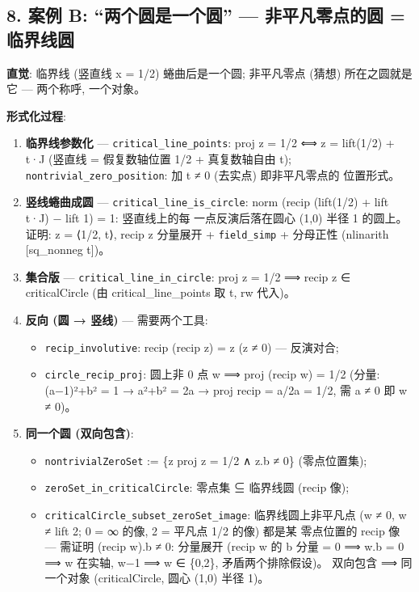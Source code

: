 \documentclass[
]{article}
\providecommand{\tightlist}{%
  \setlength{\itemsep}{0pt}\setlength{\parskip}{0pt}}
\begin{document}
\subsection{8. 案例 B: ``两个圆是一个圆'' --- 非平凡零点的圆 =
临界线圆}\label{ux6848ux4f8b-b-ux4e24ux4e2aux5706ux662fux4e00ux4e2aux5706-ux975eux5e73ux51e1ux96f6ux70b9ux7684ux5706-ux4e34ux754cux7ebfux5706}

\textbf{直觉}: 临界线 (竖直线 x = 1/2) 蜷曲后是一个圆; 非平凡零点 (猜想)
所在之圆就是它 --- 两个称呼, 一个对象。

\textbf{形式化过程}:

\begin{enumerate}
\def\labelenumi{\arabic{enumi}.}
\tightlist
\item
  \textbf{临界线参数化} --- \texttt{critical\_line\_points}: proj z =
  1/2 ⟺ z = lift(1/2) + t·J (竖直线 = 假复数轴位置 1/2 + 真复数轴自由
  t); \texttt{nontrivial\_zero\_position}: 加 t ≠ 0 (去实点)
  即非平凡零点的 位置形式。
\item
  \textbf{竖线蜷曲成圆} --- \texttt{critical\_line\_is\_circle}: norm
  (recip (lift(1/2) + lift t·J) − lift 1) = 1: 竖直线上的每
  一点反演后落在圆心 (1,0) 半径 1 的圆上。证明: z = ⟨1/2, t⟩, recip z
  分量展开 + \texttt{field\_simp} + 分母正性 (nlinarith {[}sq\_nonneg
  t{]})。
\item
  \textbf{集合版} --- \texttt{critical\_line\_in\_circle}: proj z = 1/2
  ⟹ recip z ∈ criticalCircle (由 critical\_line\_points 取 t, rw 代入)。
\item
  \textbf{反向 (圆 → 竖线)} --- 需要两个工具:

  \begin{itemize}
  \tightlist
  \item
    \texttt{recip\_involutive}: recip (recip z) = z (z ≠ 0) ---
    反演对合;
  \item
    \texttt{circle\_recip\_proj}: 圆上非 0 点 w ⟹ proj (recip w) = 1/2
    (分量: (a−1)²+b² = 1 → a²+b² = 2a → proj recip = a/2a = 1/2, 需 a ≠
    0 即 w ≠ 0)。
  \end{itemize}
\item
  \textbf{同一个圆 (双向包含)}:

  \begin{itemize}
  \tightlist
  \item
    \texttt{nontrivialZeroSet} := \{z \textbar{} proj z = 1/2 ∧ z.b ≠
    0\} (零点位置集);
  \item
    \texttt{zeroSet\_in\_criticalCircle}: 零点集 ⊆ 临界线圆 (recip 像);
  \item
    \texttt{criticalCircle\_subset\_zeroSet\_image}: 临界线圆上非平凡点
    (w ≠ 0, w ≠ lift 2; 0 = ∞ 的像, 2 = 平凡点 1/2 的像) 都是某
    零点位置的 recip 像 --- 需证明 (recip w).b ≠ 0: 分量展开 (recip w 的
    b 分量 = 0 ⟹ w.b = 0 ⟹ w 在实轴, \textbar w−1 ⟹ w ∈
    \{0,2\}, 矛盾两个排除假设)。 双向包含 ⟹ 同一个对象 (criticalCircle,
    圆心 (1,0) 半径 1)。
  \end{itemize}
\end{enumerate}
\end{document}
